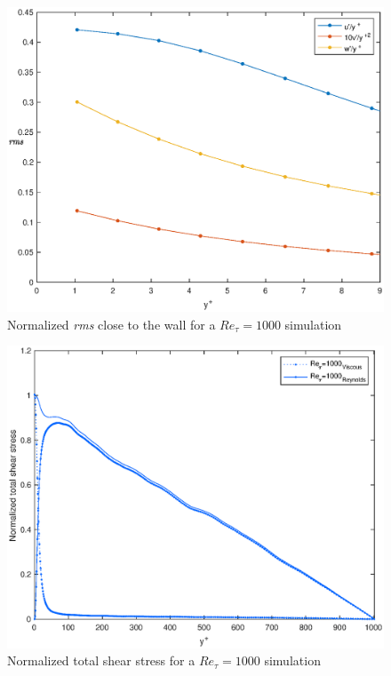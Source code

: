 \begin{figure}
\begin{center}
\includegraphics[scale=0.55]{grafici/wall_rms_1000.eps}
\caption{Normalized \emph{rms} close to the wall for a $Re_{\tau}=1000$ simulation}
\label{wall:rms:1000}
\end{center} 
\end{figure}

\begin{figure}
\begin{center}
\includegraphics[scale=0.55]{grafici/stresses_1000.eps}
\caption{Normalized total shear stress for a $Re_{\tau}=1000$ simulation}
\label{stresses:1000}
\end{center} 
\end{figure}